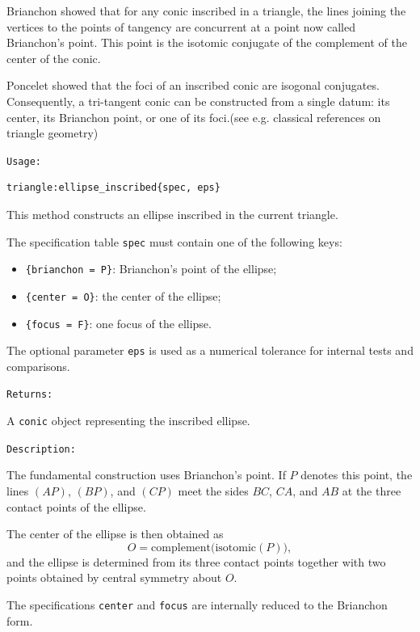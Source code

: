 Brianchon showed that for any conic inscribed in a triangle, the lines joining the vertices to the points of tangency are concurrent at a point now called Brianchon’s point. This point is the isotomic conjugate of the complement of the center of the conic.

Poncelet showed that the foci of an inscribed conic are isogonal conjugates. Consequently, a tri-tangent conic can be constructed from a single datum: its center, its Brianchon point, or one of its foci.(see e.g. classical references on triangle geometry)

\medskip
\texttt{Usage: }

\begin{verbatim}
triangle:ellipse_inscribed{spec, eps}
\end{verbatim}

\medskip

This method constructs an ellipse inscribed in the current triangle.

The specification table \texttt{spec} must contain one of the following keys:

\begin{itemize}
\item \texttt{\{brianchon = P\}}: Brianchon’s point of the ellipse;
\item \texttt{\{center = O\}}: the center of the ellipse;
\item \texttt{\{focus = F\}}: one focus of the ellipse.
\end{itemize}

The optional parameter \texttt{eps} is used as a numerical tolerance for internal
tests and comparisons.

\medskip
\texttt{Returns: }

A \texttt{conic} object representing the inscribed ellipse.

\medskip
\texttt{Description: }

The fundamental construction uses Brianchon’s point.
If $P$ denotes this point, the lines $(AP)$, $(BP)$, and $(CP)$ meet the
sides $BC$, $CA$, and $AB$ at the three contact points of the ellipse.

The center of the ellipse is then obtained as
\[
O = \text{complement}\bigl(\text{isotomic}(P)\bigr),
\]
and the ellipse is determined from its three contact points together with two
points obtained by central symmetry about $O$.

The specifications \texttt{center} and \texttt{focus} are internally reduced to
the Brianchon form.

